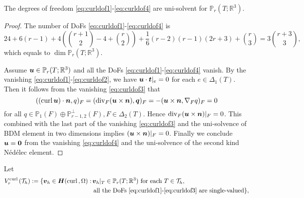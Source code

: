 \documentclass[10pt]{amsart}
\begin{document}
\begin{lemma}
The degrees of freedom \eqref{eq:curldof1}-\eqref{eq:curldof4} are uni-solvent for $\mathbb{P}_{r}(T;\mathbb R^3)$.
\end{lemma}
\begin{proof}
The number of DoFs \eqref{eq:curldof1}-\eqref{eq:curldof4} is 
$$
24+6(r-1)+4\left({r+1\choose2}-4+{r\choose2}\right)+\frac{1}{6}(r-2)(r-1)(2r+3)+{r\choose3}=3{r+3\choose3},
$$
which equals to $\dim\mathbb{P}_{r}(T;\mathbb R^3)$.

Assume $\boldsymbol u\in\mathbb{P}_{r}(T;\mathbb R^3)$ and all the DoFs \eqref{eq:curldof1}-\eqref{eq:curldof4} vanish. By the vanishing \eqref{eq:curldof1}-\eqref{eq:curldof2}, we have $\boldsymbol u\cdot\boldsymbol t|_e=0$ for each $e\in\Delta_1(T)$.
Then it follows from the vanishing \eqref{eq:curldof3} that 
$$
(({\rm curl\,}\boldsymbol u)\cdot\boldsymbol n, q)_F=(\operatorname{div}_F(\boldsymbol u\times\boldsymbol n), \boldsymbol q)_F=-(\boldsymbol u\times\boldsymbol n, \nabla_F q)_F=0
$$
for all $q\in\mathbb P_{1}(F)\oplus\mathbb P_{r-1,2}^{\perp}(F), F\in\Delta_{2}(T)$. Hence $\operatorname{div}_F(\boldsymbol u\times\boldsymbol n)|_F=0$. This combined with the last part of the vanishing \eqref{eq:curldof3} and the uni-solvence of BDM element in two dimensions implies $(\boldsymbol u\times\boldsymbol n)|_F=0$. Finally we conclude $\boldsymbol u=\boldsymbol0$ from the vanishing \eqref{eq:curldof4} and the uni-solvence of the second kind N\'ed\'elec element.
\end{proof}

Let
\begin{align*}
V_r^{{\rm curl\,}}(\mathcal T_h):=\{\boldsymbol v_h\in \boldsymbol H({\rm curl\,}, \Omega):&\, \boldsymbol v_h|_T\in\mathbb P_{r}(T;\mathbb R^3) \textrm{ for each } T\in\mathcal T_h, \\
&\textrm{ all the DoFs \eqref{eq:curldof1}-\eqref{eq:curldof3} are single-valued}\},
\end{align*}
\end{document}
